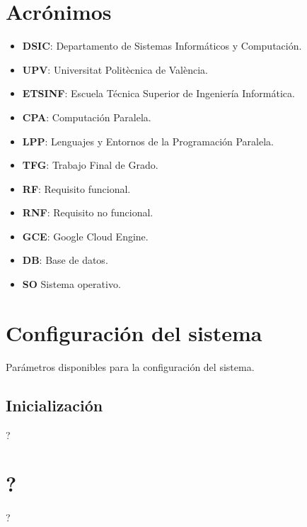 \documentclass[11pt,spanish,listoffigures,listoftables]{tfgetsinf}
\begin{document}
\APPENDIX

\chapter{Acrónimos}

\begin{itemize}
	\item \textbf{DSIC}: Departamento de Sistemas Informáticos y Computación.
	\item \textbf{UPV}: Universitat Politècnica de València.
	\item \textbf{ETSINF}: Escuela Técnica Superior de Ingeniería Informática.
	\item \textbf{CPA}: Computación Paralela.
	\item \textbf{LPP}: Lenguajes y Entornos de la Programación Paralela.
	\item \textbf{TFG}: Trabajo Final de Grado.
	\item \textbf{RF}: Requisito funcional.
	\item \textbf{RNF}: Requisito no funcional.
	\item \textbf{GCE}: Google Cloud Engine.
	\item \textbf{DB}: Base de datos.
	\item \textbf{SO} Sistema operativo.
\end{itemize}

\chapter{Configuración del sistema}

Parámetros disponibles para la configuración del sistema.

\section{Inicialización}

?

\chapter{?}

?
\end{document}
